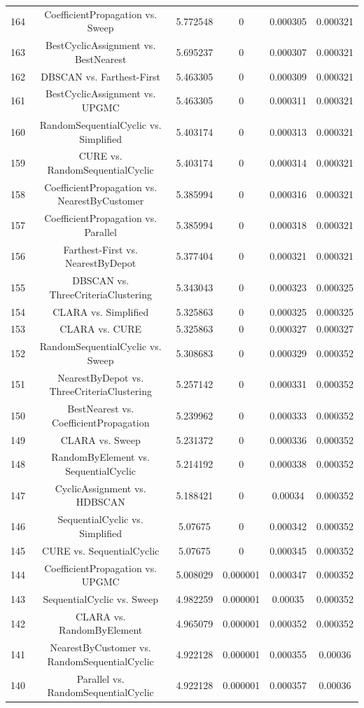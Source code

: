 \documentclass[a4paper,10pt]{article}
\begin{document}
\begin{landscape}
\begin{table}[!htp]
\begin{tabular}{cccccc}
164&CoefficientPropagation vs. Sweep&5.772548&0&0.000305&0.000321\\
163&BestCyclicAssignment vs. BestNearest&5.695237&0&0.000307&0.000321\\
162&DBSCAN vs. Farthest-First&5.463305&0&0.000309&0.000321\\
161&BestCyclicAssignment vs. UPGMC&5.463305&0&0.000311&0.000321\\
160&RandomSequentialCyclic vs. Simplified&5.403174&0&0.000313&0.000321\\
159&CURE vs. RandomSequentialCyclic&5.403174&0&0.000314&0.000321\\
158&CoefficientPropagation vs. NearestByCustomer&5.385994&0&0.000316&0.000321\\
157&CoefficientPropagation vs. Parallel&5.385994&0&0.000318&0.000321\\
156&Farthest-First vs. NearestByDepot&5.377404&0&0.000321&0.000321\\
155&DBSCAN vs. ThreeCriteriaClustering&5.343043&0&0.000323&0.000325\\
154&CLARA vs. Simplified&5.325863&0&0.000325&0.000325\\
153&CLARA vs. CURE&5.325863&0&0.000327&0.000327\\
152&RandomSequentialCyclic vs. Sweep&5.308683&0&0.000329&0.000352\\
151&NearestByDepot vs. ThreeCriteriaClustering&5.257142&0&0.000331&0.000352\\
150&BestNearest vs. CoefficientPropagation&5.239962&0&0.000333&0.000352\\
149&CLARA vs. Sweep&5.231372&0&0.000336&0.000352\\
148&RandomByElement vs. SequentialCyclic&5.214192&0&0.000338&0.000352\\
147&CyclicAssignment vs. HDBSCAN&5.188421&0&0.00034&0.000352\\
146&SequentialCyclic vs. Simplified&5.07675&0&0.000342&0.000352\\
145&CURE vs. SequentialCyclic&5.07675&0&0.000345&0.000352\\
144&CoefficientPropagation vs. UPGMC&5.008029&0.000001&0.000347&0.000352\\
143&SequentialCyclic vs. Sweep&4.982259&0.000001&0.00035&0.000352\\
142&CLARA vs. RandomByElement&4.965079&0.000001&0.000352&0.000352\\
141&NearestByCustomer vs. RandomSequentialCyclic&4.922128&0.000001&0.000355&0.00036\\
140&Parallel vs. RandomSequentialCyclic&4.922128&0.000001&0.000357&0.00036\\

\end{tabular}
\end{table}
\end{landscape}
\end{document}
